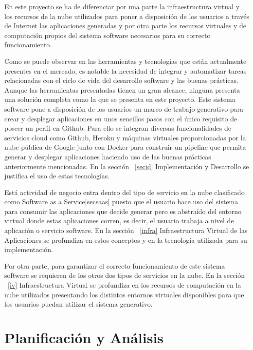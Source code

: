 \documentclass[a4paper,11pt]{book}
\begin{document}
En este proyecto se ha de diferenciar por una parte la infraestructura virtual y los recursos de la nube utilizados para poner a disposición de los usuarios  a través de Internet las aplicaciones generadas y por otra parte los recursos virtuales y de computación propios del sistema software necesarios para su correcto funcionamiento. 

Como se puede observar en las herramientas y tecnologías que están actualmente presentes en el mercado, es notable la necesidad de integrar y automatizar tareas relacionadas con el ciclo de vida del desarrollo software y las buenas prácticas. Aunque las herramientas presentadas tienen un gran alcance, ninguna presenta una solución completa como la que se presenta en este proyecto. Este sistema software pone a disposición de los usuarios un marco de trabajo generativo para crear y desplegar aplicaciones en unos sencillos pasos con el único requisito de poseer un perfil en Github. Para ello se integran diversas funcionalidades de servicios cloud como Github, Heroku y máquinas virtuales proporcionadas por la nube pública de Google  junto con Docker para construir un pipeline que permita generar y desplegar aplicaciones haciendo uso de las buenas prácticas anteriormente mencionadas. En la sección ~\ref{secid} Implementación y Desarrollo se justifica el uso de estas tecnologías. 

Está actividad de negocio entra dentro del tipo de servicio en la nube clasificado como Software as a Service\ref{secsaas} puesto que el usuario hace uso del sistema para consumir las aplicaciones que decide generar pero es abstraído del entorno virtual donde estas aplicaciones corren, es decir, el usuario trabaja a nivel de aplicación o servicio software. En la sección ~\ref{infra}  Infraestructura Virtual de las Aplicaciones se profundiza en estos conceptos y en la tecnología utilizada para su implementación. 

Por otra parte, para garantizar el correcto funcionamiento de este sistema software se requieren de los otros dos tipos de servicios en la nube. En la sección ~\ref{iv} Infraestructura Virtual se profundiza en los recursos de computación en la nube utilizados presentando los distintos entornos virtuales disponibles para que los usuarios puedan utilizar el sistema generativo.


\chapter{Planificación y Análisis}
\end{document}
